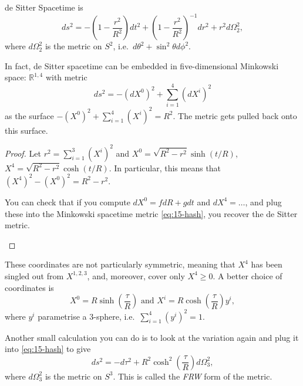 \begin{definition}[]
  de Sitter Spacetime is
  \begin{equation}
    ds^2 = - \left( 1 - \frac{r^2}{R^2} \right) dt^2 + \left( 1 - \frac{r^2}{R^2} \right)^{-1} dr^2 + r^2 d\Omega^2_2,
  \end{equation}
  where $d\Omega^2_2$ is the metric on $S^2$, i.e.~$d\theta^2 + \sin^2\theta d\phi^2$.
\end{definition}
\begin{claim}
  In fact, de Sitter spacetime can be embedded in five-dimensional Minkowski space: $\mathbb{R}^{1, 4}$ with metric
  \begin{equation}
    \label{eq:15-hash}
    ds^2 = -(dX^0)^2 + \sum_{i=1}^{4} (dX^{i})^2
  \end{equation}
  as the surface $-(X^0)^2 + \sum_{i=1}^{4} (X^{i})^2 = R^2$.
  The metric gets pulled back onto this surface.
\end{claim}
\begin{proof}
  Let $r^2 = \sum_{i=1}^{3} (X^{i})^2$ and $X^0 = \sqrt{R^2 - r^2} \sinh(t/R)$, $X^4 = \sqrt{R^2 - r^2} \cosh(t/R)$. In particular, this means that $(X^4)^2 - (X^0)^2 = R^2 - r^2$.
  \begin{exercise}
    You can check that if you compute $dX^0 = f dR + g dt$ and $dX^4 = \dots$, and plug these into the Minkowski spacetime metric \eqref{eq:15-hash}, you recover the de Sitter metric.
  \end{exercise}
\end{proof}
These coordinates are not particularly symmetric, meaning that $X^4$ has been singled out from $X^{1, 2, 3}$, and, moreover, cover only $X^4 \geq 0$.
A better choice of coordinates is
\begin{equation}
  X^0 = R\sinh( \frac{\tau}{R}) \text{ and } X^{i} = R \cosh( \frac{\tau}{R}) y^{i},
\end{equation}
where $y^{i}$ parametrise a 3-sphere, i.e.~$\sum_{i = 1}^{4} (y^{i})^2 = 1$.
\begin{exercise}
  Another small calculation you can do is to look at the variation again and plug it into \eqref{eq:15-hash} to give
  \begin{equation}
    ds^2 = -d\tau^2 + R^2 \cosh^2(\frac{\tau}{R}) d\Omega^2_3,
  \end{equation}
  where $d\Omega_3^2$ is the metric on $S^3$.
  This is called the \emph{FRW} form of the metric.
\end{exercise}
